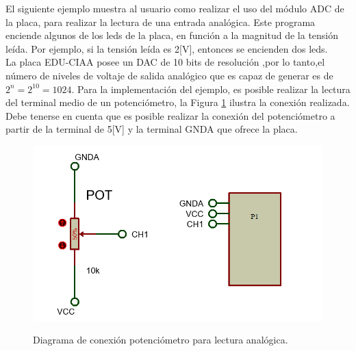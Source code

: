 \documentclass[12pt,letterpaper]{article}
\begin{document}
El siguiente ejemplo muestra al usuario como realizar el uso del módulo ADC de la placa, para realizar la lectura de una entrada analógica. Este programa enciende algunos de los leds de la placa, en función a la magnitud de la tensión leída. Por ejemplo, si la tensión leída es 2[V], entonces se encienden dos leds.
 \\
 
La placa EDU-CIAA posee un DAC de 10 bits de resolución ,por lo tanto,el número de niveles de voltaje de salida analógico que es capaz de generar es de $2^{n}=2^{10}=1024$.
Para la implementación del ejemplo, es posible realizar la lectura del terminal medio de un potenciómetro, la Figura \ref{Fig24} ilustra la conexión realizada. Debe tenerse en cuenta que es posible realizar la conexión del potenciómetro a partir de la terminal de 5[V] y la terminal GNDA que ofrece la placa.

\begin{figure}[H]
\centering
\includegraphics[width=10 cm]{figuras/potenciometro_ejemplo_4_baremetal.png}\\
\caption{Diagrama de conexión potenciómetro para lectura analógica.}
\label{Fig24}
\end{figure}
\end{document}
